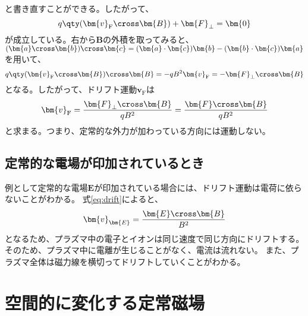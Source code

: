 と書き直すことができる。したがって、
\begin{equation}
	q\qty(\bm{v}_{\text{F}}\cross\bm{B}) + \bm{F}_{\perp} = \bm{0}
\end{equation}
が成立している。右から$\bm{B}$の外積を取ってみると、$(\bm{a}\cross \bm{b})\cross \bm{c} = (\bm{a}\cdot \bm{c})\bm{b} - (\bm{b}\cdot \bm{c})\bm{a}$を用いて、
\begin{equation}
	q\qty(\bm{v}_{\text{F}}\cross\bm{B})\cross\bm{B} = -qB^2\bm{v}_{\text{F}} = -\bm{F}_{\perp}\cross\bm{B}
\end{equation}
となる。したがって、ドリフト運動$\bm{v}_{\text{F}}$は
\begin{equation}
	\bm{v}_{\text{F}} = \frac{\bm{F}_{\perp}\cross\bm{B}}{qB^2} = \frac{\bm{F}\cross\bm{B}}{qB^2}
	\label{eq:drift}
\end{equation}
と求まる。つまり、定常的な外力が加わっている方向には運動しない。
\subsection{定常的な電場が印加されているとき}
例として定常的な電場$\bm{E}$が印加されている場合には、ドリフト運動は電荷に依らないことがわかる。
式\eqref{eq:drift}によると、
\begin{equation}
	\bm{v}_{\bm{E}} = \frac{\bm{E}\cross\bm{B}}{B^2}
\end{equation}
となるため、プラズマ中の電子とイオンは同じ速度で同じ方向にドリフトする。そのため、プラズマ中に電離が生じることがなく、電流は流れない。
また、プラズマ全体は磁力線を横切ってドリフトしていくことがわかる。

\newpage
\section{空間的に変化する定常磁場}
